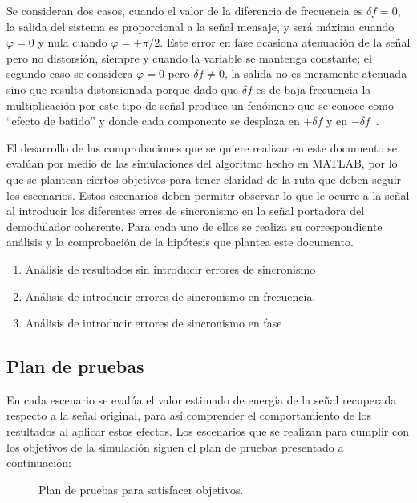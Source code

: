 Se consideran dos casos, cuando el valor de la diferencia de frecuencia es $\delta f=0$, la salida del sistema es proporcional a la señal mensaje, y será máxima cuando $\varphi=0$ y nula cuando $\varphi =\pm \pi /2$. Este error en fase ocasiona atenuación de la señal pero no distorsión, siempre y cuando la variable se mantenga constante; el segundo caso se considera $\varphi =0$ pero $\delta f\neq 0$, la salida no es meramente atenuada sino que resulta distorsionada porque dado que $\delta f$ es de baja frecuencia la multiplicación por este tipo de señal produce un fenómeno que se conoce como ``efecto de batido'' y donde cada componente se desplaza en $+ \delta f$ y en $- \delta f$~\cite{SuarezVargas2012}.

El desarrollo de las comprobaciones que se quiere realizar en este documento se evalúan por medio de las simulaciones del algoritmo hecho en MATLAB, por lo que se plantean ciertos objetivos para tener claridad de la ruta que deben seguir los escenarios. Estos escenarios deben permitir observar lo que le ocurre a la señal al introducir los diferentes erres de sincronismo en la señal portadora del demodulador coherente. Para cada uno de ellos se realiza su correspondiente análisis y la comprobación de la hipótesis que plantea este documento.

\begin{enumerate}
	\item Análisis de resultados sin introducir errores de sincronismo
	\item Análisis de introducir errores de sincronismo en frecuencia.
	\item Análisis de introducir errores de sincronismo en fase
\end{enumerate}

\subsection{Plan de pruebas}
En cada escenario se evalúa el valor estimado de energía de la señal recuperada respecto a la señal original, para así comprender el comportamiento de los resultados al aplicar estos efectos. Los escenarios que se realizan para cumplir con los objetivos de la simulación siguen el plan de pruebas presentado a continuación:

\vspace{-3mm}
\begin{figure}[h]
	\centering
	\scriptsize{
		
	}
	\vspace{-2mm}
	\caption{\scriptsize Plan de pruebas para satisfacer objetivos.}
	\vspace{-6mm}
	\label{fig:planpruebas}
\end{figure}
